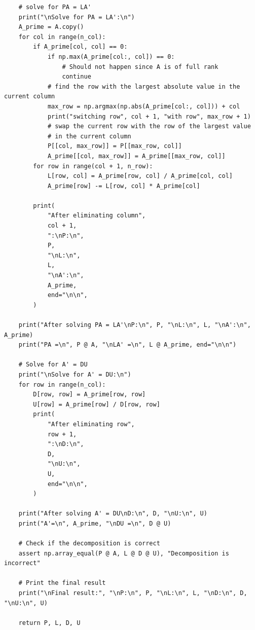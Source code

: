 \documentclass[conference,onecolumn]{IEEEtran}
\begin{document}
\begin{enumerate}[label=\arabic{enumi}.]
\begin{lstlisting}
    # solve for PA = LA'
    print("\nSolve for PA = LA':\n")
    A_prime = A.copy()
    for col in range(n_col):
        if A_prime[col, col] == 0:
            if np.max(A_prime[col:, col]) == 0:
                # Should not happen since A is of full rank
                continue
            # find the row with the largest absolute value in the current column
            max_row = np.argmax(np.abs(A_prime[col:, col])) + col
            print("switching row", col + 1, "with row", max_row + 1)
            # swap the current row with the row of the largest value
            # in the current column
            P[[col, max_row]] = P[[max_row, col]]
            A_prime[[col, max_row]] = A_prime[[max_row, col]]
        for row in range(col + 1, n_row):
            L[row, col] = A_prime[row, col] / A_prime[col, col]
            A_prime[row] -= L[row, col] * A_prime[col]

        print(
            "After eliminating column",
            col + 1,
            ":\nP:\n",
            P,
            "\nL:\n",
            L,
            "\nA':\n",
            A_prime,
            end="\n\n",
        )

    print("After solving PA = LA'\nP:\n", P, "\nL:\n", L, "\nA':\n", A_prime)
    print("PA =\n", P @ A, "\nLA' =\n", L @ A_prime, end="\n\n")

    # Solve for A' = DU
    print("\nSolve for A' = DU:\n")
    for row in range(n_col):
        D[row, row] = A_prime[row, row]
        U[row] = A_prime[row] / D[row, row]
        print(
            "After eliminating row",
            row + 1,
            ":\nD:\n",
            D,
            "\nU:\n",
            U,
            end="\n\n",
        )

    print("After solving A' = DU\nD:\n", D, "\nU:\n", U)
    print("A'=\n", A_prime, "\nDU =\n", D @ U)

    # Check if the decomposition is correct
    assert np.array_equal(P @ A, L @ D @ U), "Decomposition is incorrect"

    # Print the final result
    print("\nFinal result:", "\nP:\n", P, "\nL:\n", L, "\nD:\n", D, "\nU:\n", U)

    return P, L, D, U
            \end{lstlisting}


\end{enumerate}
\end{document}
